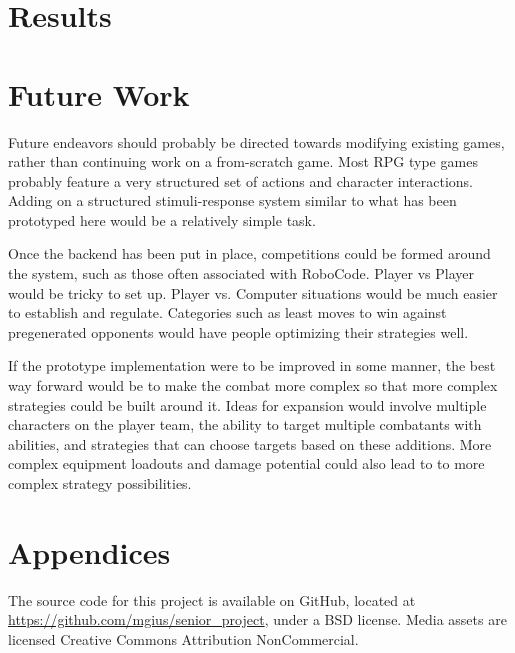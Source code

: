 \documentclass[11pt]{article}
\begin{document}
\section{Results} 

\section{Future Work}

Future endeavors should probably be directed towards modifying existing games, rather than continuing work on a from-scratch game.  Most RPG type games probably feature a very structured set of actions and character interactions.  Adding on a structured stimuli-response system similar to what has been prototyped here would be a relatively simple task.

Once the backend has been put in place, competitions could be formed around the system, such as those often associated with RoboCode.  Player vs Player would be tricky to set up.  Player vs. Computer situations would be much easier to establish and regulate.  Categories such as least moves to win against pregenerated opponents would have people optimizing their strategies well. 

If the prototype implementation were to be improved in some manner, the best way forward would be to make the combat more complex so that more complex strategies could be built around it.  Ideas for expansion would involve multiple characters on the player team, the ability to target multiple combatants with abilities, and strategies that can choose targets based on these additions. More complex equipment loadouts and damage potential could also lead to to more complex strategy possibilities.


\section{Appendices}

The source code for this project is available on GitHub, located at \url{https://github.com/mgius/senior_project}, under a BSD license.  Media assets are licensed Creative Commons Attribution NonCommercial.





\end{document}
